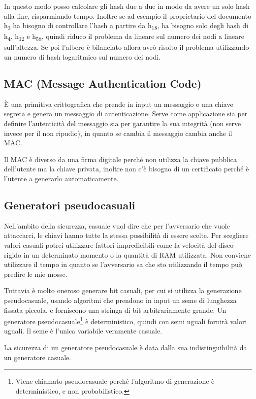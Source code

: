 In questo modo posso calcolare gli hash due a due in modo da avere un solo hash alla fine, risparmiando tempo. Inoltre se ad esempio il proprietario del documento h\textsubscript{3} ha bisogno di controllare l'hash a partire da h\textsubscript{18}, ha bisogno solo degli hash di h\textsubscript{4}, h\textsubscript{12} e h\textsubscript{58}, quindi riduco il problema da lineare sul numero dei nodi a lineare sull'altezza. Se poi l'albero è bilanciato allora avrò risolto il problema utilizzando un numero di hash logaritmico sul numero dei nodi.

\subsection{MAC (Message Authentication Code)}
È una primitiva crittografica che prende in input un messaggio e una chiave segreta e genera un messaggio di autenticazione. Serve come applicazione sia per definire l'autenticità del messaggio sia per garantire la sua integrità (non serve invece per il non ripudio), in quanto se cambia il messaggio cambia anche il MAC.

Il MAC è diverso da una firma digitale perché non utilizza la chiave pubblica dell'utente ma la chiave privata, inoltre non c'è bisogno di un certificato perché è l'utente a generarlo automaticamente.

\subsection{Generatori pseudocasuali}
Nell'ambito della sicurezza, casuale vuol dire che per l'avversario che vuole attaccarci, le chiavi hanno tutte la stessa possibilità di essere scelte. Per scegliere valori casuali potrei utilizzare fattori impredicibili come la velocità del disco rigido in un determinato momento o la quantità di RAM utilizzata. Non conviene utilizzare il tempo in quanto se l'avversario sa che sto utilizzando il tempo può predire le mie mosse.

Tuttavia è molto oneroso generare bit casuali, per cui si utilizza la generazione pseudocasuale, usando algoritmi che prendono in input un seme di lunghezza fissata piccola, e forniscono una stringa di bit arbitrariamente grande. Un generatore pseudocasuale\footnote{Viene chiamato pseudocasuale perché l'algoritmo di generazione è deterministico, e non probabilistico.} è deterministico, quindi con semi uguali fornirà valori uguali. Il seme è l'unica variabile veramente casuale.

La sicurezza di un generatore pseudocasuale è data dalla sua indistinguibilità da un generatore casuale.

